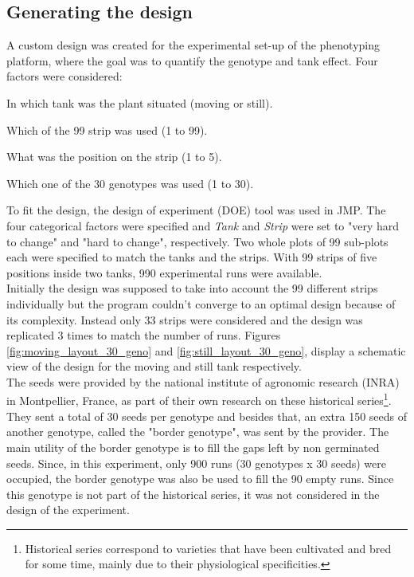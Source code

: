 \subsection{Generating the design}
A custom design was created for the experimental set-up of the phenotyping platform, where the goal was to quantify the genotype 
and tank effect. Four factors were considered:

\begin{description}[align=left]
\item [Tank] In which tank was the plant situated (moving or still).
\item [Strip] Which of the 99 strip was used (1 to 99).
\item [Position] What was the position on the strip (1 to 5).
\item [Genotype] Which one of the 30 genotypes was used (1 to 30).
\end{description}

To fit the design, the design of experiment (DOE) tool was used in JMP. The four categorical factors were specified and 
\textit{Tank} and \textit{Strip} were set to "very hard to change" and "hard to change", respectively. Two whole plots of 99 
sub-plots each were specified to match the tanks and the strips. With 99 strips of five positions inside two tanks, 990 
experimental runs were available.\\
Initially the design was supposed to take into account the 99 different strips individually but the program couldn't converge to 
an optimal design because of its complexity. Instead only 33 strips were considered and the design was replicated 3 times to 
match the number of runs. Figures \ref{fig:moving_layout_30_geno} and \ref{fig:still_layout_30_geno}, display a schematic view 
of the design for the moving and still tank respectively.\\
The seeds were provided by the national institute of agronomic research (INRA) in Montpellier, France, as part of their own 
research on these historical series\footnote{Historical series correspond to varieties that have been cultivated and bred for 
some time, mainly due to their physiological specificities.}. They sent a total of 30 seeds per genotype and besides that, an 
extra 150 seeds of another genotype, called the "border genotype", was sent by the provider. The main utility of the border 
genotype is to fill the gaps left by non germinated seeds. Since, in this experiment, only 900 runs (30 genotypes x 30 seeds) 
were occupied, the border genotype was also be used to fill the 90 empty runs. Since this genotype is not part of the historical 
series, it was not considered in the design of the experiment.

